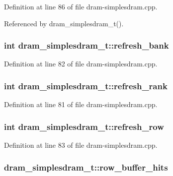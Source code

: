Definition at line 86 of file dram-simplesdram.cpp.

Referenced by dram\_\-simplesdram\_\-t().
\subsubsection[{refresh\_\-bank}]{\setlength{\rightskip}{0pt plus 5cm}int {\bf dram\_\-simplesdram\_\-t::refresh\_\-bank}\hspace{0.3cm}{\tt  [protected]}}\label{classdram__simplesdram__t_ca4f44bffa2217a6cb6a88b56f60f027}




Definition at line 82 of file dram-simplesdram.cpp.
\subsubsection[{refresh\_\-rank}]{\setlength{\rightskip}{0pt plus 5cm}int {\bf dram\_\-simplesdram\_\-t::refresh\_\-rank}\hspace{0.3cm}{\tt  [protected]}}\label{classdram__simplesdram__t_214d3e45d655c941e35f74748c308d75}




Definition at line 81 of file dram-simplesdram.cpp.
\subsubsection[{refresh\_\-row}]{\setlength{\rightskip}{0pt plus 5cm}int {\bf dram\_\-simplesdram\_\-t::refresh\_\-row}\hspace{0.3cm}{\tt  [protected]}}\label{classdram__simplesdram__t_96e541f5cb266e75c2e0660bc4ba85fe}




Definition at line 83 of file dram-simplesdram.cpp.
\subsubsection[{row\_\-buffer\_\-hits}]{ {\bf dram\_\-simplesdram\_\-t::row\_\-buffer\_\-hits}\hspace{0.3cm}{\tt  [protected]}}\label{classdram__simplesdram__t_c9a4538caa3feb52ea0cc344743bae98}




